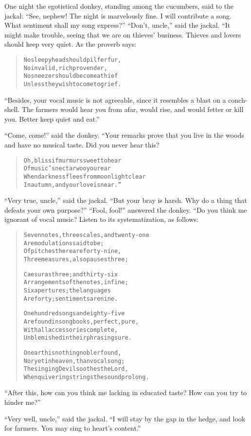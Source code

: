 \documentclass[article, twoside, 14pt]{memoir}
\renewenvironment{verbatim}{%
\begin{quote}%
\vskip -10pt%
\begin{alltt}\normalfont\large}{\end{alltt}%
\end{quote}%
\vskip -10pt
} %
\begin{document}
One night the egotistical donkey, standing among the cucumbers,
said to the jackal:
``See, nephew! The night is marvelously fine. I will contribute a song. What sentiment shall my song express?''
``Don't, uncle,'' said the jackal. “It might make trouble, seeing
that we are on thieves' business. Thieves and lovers should keep
very quiet. As the proverb says:

\begin{verbatim}
No sleepyhead should pilfer fur,
No invalid, rich provender,
No sneezer should become a thief{\textemdash}
Unless they wish to come to grief.
\end{verbatim}
``Besides, your vocal music is not agreeable, since it resembles a blast on a conch-shell. The farmers would hear you from afar, would rise, and would fetter or kill you. Better keep quiet and eat.''

``Come, come!'' said the donkey. “Your remarks prove that you live
in the woods and have no musical taste. Did you never hear this?

\begin{verbatim}
Oh, bliss if murmurs sweet to hear
Of music's nectar woo your ear
When darkness flees from moonlight clear
In autumn, and your love is near.”
\end{verbatim}
``Very true, uncle,'' said the jackal.
``But your bray is harsh. Why do a thing that defeats your own purpose?''
``Fool, fool!'' answered the donkey. “Do you think me ignorant of
vocal music? Listen to its systematization, as follows:

\begin{verbatim}
Seven notes, three scales, and twenty-one
    Are modulations said to be;
Of pitches there are forty-nine,
    Three measures, also pauses three;

Caesuras three; and thirty-six
    Arrangements of the notes, in fine;
Six apertures; the languages
    Are forty; sentiments are nine.

One hundred songs and eighty-five
    Are found in songbooks, perfect, pure,
With all accessories complete,
    Unblemished in their phrasing sure.

On earth is nothing nobler found,
    Nor yet in heaven, than vocal song;
The singing Devil soothes the Lord,
    When quivering strings the sound prolong.
\end{verbatim}
``After this, how can you think me lacking in educated taste? How can you try to hinder me?''

``Very well, uncle,'' said the jackal.
``I will stay by the gap in the hedge, and look for farmers. You may sing to heart's content.''
\end{document}
